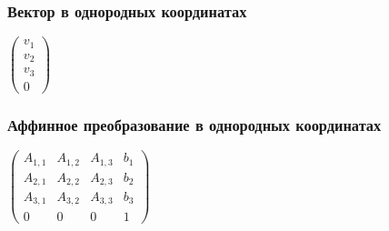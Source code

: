 \documentclass{beamer}
\begin{document}
\begin{frame}[fragile]
\frametitle{Вектор в однородных координатах}
\begin{center}
\begin{math}
\begin{pmatrix}
v_1 \\
v_2 \\
v_3 \\
0
\end{pmatrix}
\end{math}
\end{center}
\end{frame}

\begin{frame}[fragile]
\frametitle{Аффинное преобразование в однородных координатах}
\begin{center}
\begin{math}
\begin{pmatrix}
A_{1,1} & A_{1,2} & A_{1,3} & b_1 \\
A_{2,1} & A_{2,2} & A_{2,3} & b_2 \\
A_{3,1} & A_{3,2} & A_{3,3} & b_3 \\
0 & 0 & 0 & 1
\end{pmatrix}
\end{math}
\end{center}
\end{frame}
\end{document}

